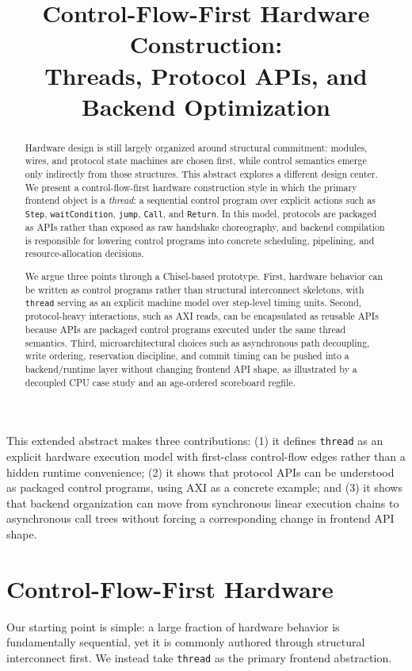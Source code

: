 \documentclass[conference]{IEEEtran}
\title{Control-Flow-First Hardware Construction:\\
Threads, Protocol APIs, and Backend Optimization}
\author{
\IEEEauthorblockN{Anonymous Submission}
\IEEEauthorblockA{OSCAR Workshop Extended Abstract}
}
\begin{document}
\maketitle

\begin{abstract}
Hardware design is still largely organized around structural commitment: modules, wires, and protocol state machines are chosen first, while control semantics emerge only indirectly from those structures. This abstract explores a different design center. We present a control-flow-first hardware construction style in which the primary frontend object is a \emph{thread}: a sequential control program over explicit actions such as \texttt{Step}, \texttt{waitCondition}, \texttt{jump}, \texttt{Call}, and \texttt{Return}. In this model, protocols are packaged as APIs rather than exposed as raw handshake choreography, and backend compilation is responsible for lowering control programs into concrete scheduling, pipelining, and resource-allocation decisions.

We argue three points through a Chisel-based prototype. First, hardware behavior can be written as control programs rather than structural interconnect skeletons, with \texttt{thread} serving as an explicit machine model over step-level timing units. Second, protocol-heavy interactions, such as AXI reads, can be encapsulated as reusable APIs because APIs are packaged control programs executed under the same thread semantics. Third, microarchitectural choices such as asynchronous path decoupling, write ordering, reservation discipline, and commit timing can be pushed into a backend/runtime layer without changing frontend API shape, as illustrated by a decoupled CPU case study and an age-ordered scoreboard regfile.
\end{abstract}

This extended abstract makes three contributions: (1) it defines \texttt{thread} as an explicit hardware execution model with first-class control-flow edges rather than a hidden runtime convenience; (2) it shows that protocol APIs can be understood as packaged control programs, using AXI as a concrete example; and (3) it shows that backend organization can move from synchronous linear execution chains to asynchronous call trees without forcing a corresponding change in frontend API shape.

\section{Control-Flow-First Hardware}
Our starting point is simple: a large fraction of hardware behavior is fundamentally sequential, yet it is commonly authored through structural interconnect first. We instead take \texttt{thread} as the primary frontend abstraction.
\end{document}
